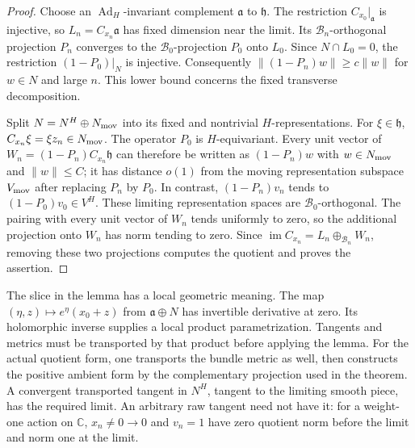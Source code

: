 \documentclass[11pt]{amsart}
\theoremstyle{definition}
\theoremstyle{remark}
\newcommand{\CC}{\mathbb C}
\newcommand{\im}{\operatorname{im}}
\begin{document}
\begin{proof}
Choose an $\operatorname{Ad}_H$-invariant complement $\mathfrak a$
to $\mathfrak h$. The restriction $C_{x_0}|_{\mathfrak a}$ is
injective, so $L_n=C_{x_n}\mathfrak a$ has fixed dimension near
the limit. Its $\mathcal B_n$-orthogonal projection $P_n$ converges
to the $\mathcal B_0$-projection $P_0$ onto $L_0$.
Since $N\cap L_0=0$, the restriction $(1-P_0)|_N$ is injective.
Consequently $\|(1-P_n)w\|\ge c\|w\|$ for $w\in N$ and
large $n$. This lower bound concerns the fixed transverse decomposition.

Split $N=N^H\oplus N_{\rm mov}$ into its fixed and nontrivial
$H$-representations. For $\xi\in\mathfrak h$,
$C_{x_n}\xi=\xi z_n\in N_{\rm mov}$.
The operator $P_0$ is $H$-equivariant. Every unit vector of
$W_n=(1-P_n)C_{x_n}\mathfrak h$ can therefore be written as
$(1-P_n)w$ with $w\in N_{\rm mov}$ and $\|w\|\le C$;
it has distance $o(1)$ from the moving representation subspace
$V_{\rm mov}$ after replacing $P_n$ by $P_0$.
In contrast, $(1-P_n)v_n$ tends to $(1-P_0)v_0\in V^H$.
These limiting representation spaces are $\mathcal B_0$-orthogonal.
The pairing with every unit vector of $W_n$ tends uniformly to zero,
so the additional projection onto $W_n$ has norm tending to zero.
Since
$\im C_{x_n}=L_n\oplus_{\mathcal B_n}W_n$, removing these two
projections computes the quotient and proves the assertion.
\end{proof}

The slice in the lemma has a local geometric meaning. The map
$(\eta,z)\mapsto e^\eta(x_0+z)$ from $\mathfrak a\oplus N$
has invertible derivative at zero. Its holomorphic inverse supplies a
local product parametrization. Tangents and metrics must be transported
by that product before applying the lemma. For the actual quotient form,
one transports the bundle metric as well, then constructs the positive
ambient form by the complementary projection used in the theorem.
A convergent transported tangent in $N^H$, tangent to the limiting smooth
piece, has the required limit. An arbitrary raw tangent need not have it:
for a weight-one action on $\CC$, $x_n\ne0\to0$ and $v_n=1$ have
zero quotient norm before the limit and norm one at the limit.
\end{document}
